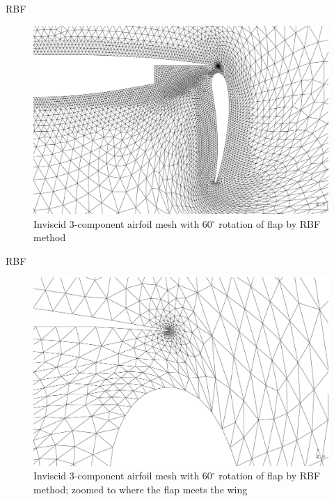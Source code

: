 \documentclass[t,12pt]{beamer}
\begin{document}
\begin{frame}{RBF}
\begin{figure}
	\centering
	\includegraphics[scale=0.17]{wing60-rbf-sr15-s3}
	\caption{Inviscid 3-component airfoil mesh with 60$^\circ$ rotation of flap by RBF method}
	\label{fig:wing-inviscid-rbf}
\end{figure}
\end{frame}
\begin{frame}{RBF}
\begin{figure}
	\centering
	\includegraphics[scale=0.17]{wing60-rbf-sr15-s3_zoomed}
	\caption{Inviscid 3-component airfoil mesh with 60$^\circ$ rotation of flap by RBF method; zoomed to where the flap meets the wing}
	\label{fig:wing-inviscid-rbf-zoomed}
\end{figure}
\end{frame}
\end{document}

